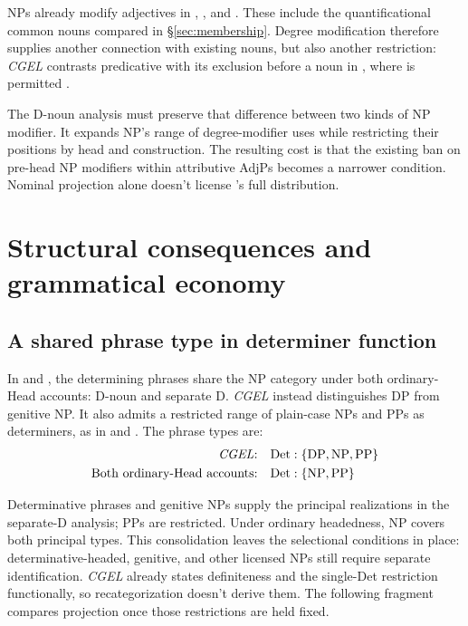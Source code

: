 \documentclass[12pt]{article}
\begin{document}
NPs already modify adjectives in , , and  \citep[549--550]{huddleston2002}. These include the quantificational common nouns compared in §\ref{sec:membership}. Degree modification therefore supplies another connection with existing nouns, but also another restriction: \textit{CGEL} contrasts predicative  with its exclusion before a noun in , where  is permitted \citep[551--552]{huddleston2002}.

The D-noun analysis must preserve that difference between two kinds of NP modifier. It expands NP's range of degree-modifier uses while restricting their positions by head and construction. The resulting cost is that the existing ban on pre-head NP modifiers within attributive AdjPs becomes a narrower condition. Nominal projection alone doesn't license 's full distribution.

\section{Structural consequences and grammatical economy}\label{sec:economy}

\subsection{A shared phrase type in determiner function}\label{sec:det-uniform}

In  and , the determining phrases share the NP category under both ordinary-Head accounts: D-noun and separate D. \textit{CGEL} instead distinguishes DP from genitive NP. It also admits a restricted range of plain-case NPs and PPs as determiners, as in  and  \citep[Ch.~5, §4]{huddleston2002}. The phrase types are:
\[
\begin{aligned}
\text{\textit{CGEL}:} &\quad \mathrm{Det}:\{\mathrm{DP},\mathrm{NP},\mathrm{PP}\} \\
\text{Both ordinary-Head accounts:} &\quad \mathrm{Det}:\{\mathrm{NP},\mathrm{PP}\}
\end{aligned}
\]

Determinative phrases and genitive NPs supply the principal realizations in the separate-D analysis; PPs are restricted. Under ordinary headedness, NP covers both principal types. This consolidation leaves the selectional conditions in place: determinative-headed, genitive, and other licensed NPs still require separate identification. \textit{CGEL} already states definiteness and the single-Det restriction functionally, so recategorization doesn't derive them. The following fragment compares projection once those restrictions are held fixed.
\end{document}
